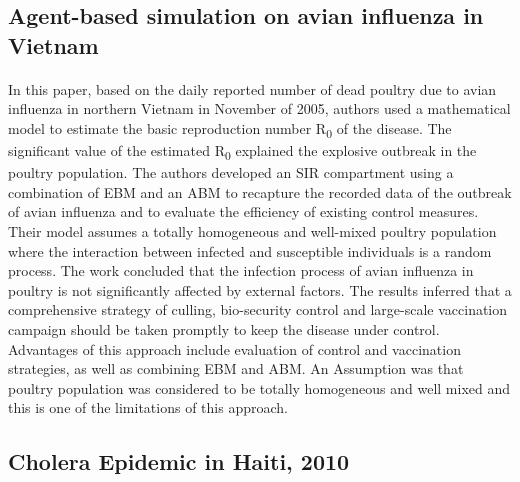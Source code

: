 \documentclass[12pt, a4paper]{extarticle}
\begin{document}
        \subsection{Agent-based simulation on avian influenza in Vietnam}
            \paragraph{} In this paper, based on the daily reported number of dead poultry due to avian influenza in northern Vietnam in November of 2005, authors used a mathematical model to estimate the basic reproduction number R\textsubscript{0} of the disease. The significant value of the estimated R\textsubscript{0} explained the explosive outbreak in the poultry population. The authors developed an SIR compartment using a combination of EBM and an ABM to recapture the recorded data of the outbreak of avian influenza and to evaluate the efficiency of existing control measures. Their model assumes a totally homogeneous and well-mixed poultry population where the interaction between infected and susceptible individuals is a random process. The work concluded that the infection process of avian influenza in poultry is not significantly affected by external factors. The results inferred that a comprehensive strategy of culling, bio-security control and large-scale vaccination campaign should be taken promptly to keep the disease under control. Advantages of this approach include evaluation of control and vaccination strategies, as well as combining EBM and ABM. An Assumption was that poultry population was considered to be totally homogeneous and well mixed and this is one of the limitations of this approach.
        \subsection{Cholera Epidemic in Haiti, 2010}
\end{document}
